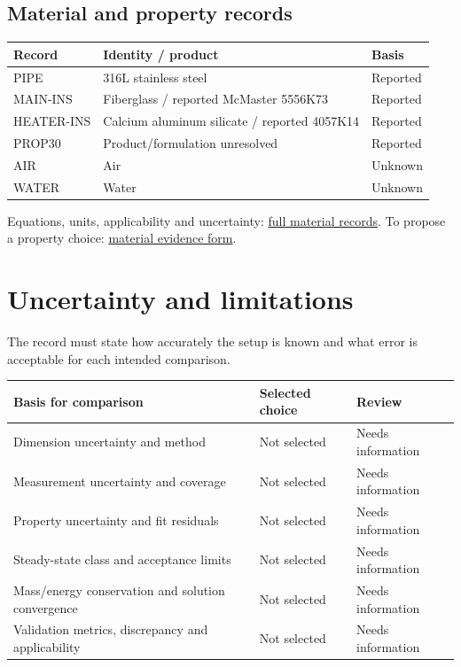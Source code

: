 \documentclass[11pt]{article}
\begin{document}
\subsection*{Material and property records}
\small\setlength{\tabcolsep}{4pt}
\begin{longtable}{>{\raggedright\arraybackslash}p{}>{\raggedright\arraybackslash}p{}>{\raggedright\arraybackslash}p{}}
\toprule
\textbf{Record} & \textbf{Identity / product} & \textbf{Basis} \\\midrule\endhead
PIPE & 316L stainless steel & Reported \\[3pt]
MAIN-INS & Fiberglass / reported McMaster 5556K73 & Reported \\[3pt]
HEATER-INS & Calcium aluminum silicate / reported 4057K14 & Reported \\[3pt]
PROP30 & Product/formulation unresolved & Reported \\[3pt]
AIR & Air & Unknown \\[3pt]
WATER & Water & Unknown \\[3pt]
\bottomrule\end{longtable}\normalsize
\vfill{\small Equations, units, applicability and uncertainty: \hyperref[model-records]{full material records}. To propose a property choice: \hyperref[form-material]{material evidence form}.}\par
\clearpage\section{Uncertainty and limitations}\label{uncertainty-main}
The record must state how accurately the setup is known and what error is acceptable for each intended comparison.
\small\setlength{\tabcolsep}{4pt}
\begin{longtable}{>{\raggedright\arraybackslash}p{}>{\raggedright\arraybackslash}p{}>{\raggedright\arraybackslash}p{}}
\toprule
\textbf{Basis for comparison} & \textbf{Selected choice} & \textbf{Review} \\\midrule\endhead
Dimension uncertainty and method & Not selected & Needs information \\[3pt]
Measurement uncertainty and coverage & Not selected & Needs information \\[3pt]
Property uncertainty and fit residuals & Not selected & Needs information \\[3pt]
Steady-state class and acceptance limits & Not selected & Needs information \\[3pt]
Mass/energy conservation and solution convergence & Not selected & Needs information \\[3pt]
Validation metrics, discrepancy and applicability & Not selected & Needs information \\[3pt]
\bottomrule\end{longtable}\normalsize
\end{document}
